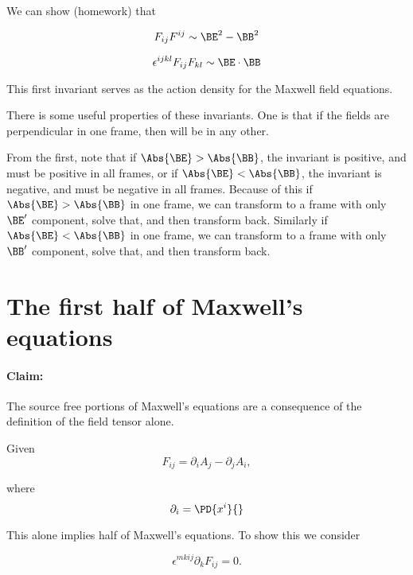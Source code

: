 We can show (homework) that

\begin{equation}\label{eqn:relativisticElectrodynamicsL11:630}
F_{i j}F^{i j} \sim \BE^2 - \BB^2
\end{equation}

\begin{equation}\label{eqn:relativisticElectrodynamicsL11:650}
\epsilon^{i j k l} F_{i j}F_{k l} \sim \BE \cdot \BB
\end{equation}

This first invariant serves as the action density for the Maxwell field equations.

There is some useful properties of these invariants.  One is that if the fields are perpendicular in one frame, then will be in any other.  

From the first, note that if $\Abs{\BE} > \Abs{\BB}$, the invariant is positive, and must be positive in all frames, or if $\Abs{\BE} < \Abs{\BB}$, the invariant is negative, and must be negative in all frames.  Because of this if $\Abs{\BE} > \Abs{\BB}$ in one frame, we can transform to a frame with only $\BE'$ component, solve that, and then transform back.  Similarly if $\Abs{\BE} < \Abs{\BB}$ in one frame, we can transform to a frame with only $\BB'$ component, solve that, and then transform back.

\section{The first half of Maxwell's equations}

\paragraph{Claim: } The source free portions of Maxwell's equations are a consequence of the definition of the field tensor alone.

Given
\begin{equation}\label{eqn:relativisticElectrodynamicsL11:670}
F_{i j} = \partial_i A_j - \partial_j A_i,
\end{equation}

where
\begin{equation}\label{eqn:relativisticElectrodynamicsL11:690}
\partial_i = \PD{x^i}{}
\end{equation}

This alone implies half of Maxwell's equations.  To show this we consider

\begin{equation}\label{eqn:relativisticElectrodynamicsL11:710}
\epsilon^{m k i j} \partial_k F_{i j} = 0.
\end{equation}

